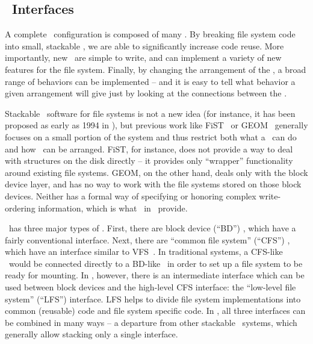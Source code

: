 \subsection {\Module\ Interfaces}
\label{sec:design:interfaces}

A complete \Kudos\ configuration is composed of many \modules. By breaking file
system code into small, stackable \modules, we are able to significantly
increase code reuse. More importantly, new \modules\ are simple to write, and
can implement a variety of new features for the file system. Finally, by
changing the arrangement of the \modules, a broad range of behaviors can be
implemented -- and it is easy to tell what behavior a given arrangement will
give just by looking at the connections between the \modules.


Stackable \module\ software for file systems is not a new idea (for instance, it
has been proposed as early as 1994 in \cite{heidemann94stackable}), but previous
work like FiST~\cite{zadok00fist} or GEOM~\cite{geom} generally focuses on a
small portion of the system and thus restrict both what a \module\ can do and
how \modules\ can be arranged. FiST, for instance, does not provide a way to
deal with structures on the disk directly -- it provides only ``wrapper''
functionality around existing file systems. GEOM, on the other hand, deals only
with the block device layer, and has no way to work with the file systems stored
on those block devices. Neither has a formal way of specifying or honoring
complex write-ordering information, which is what \chdescs\ in \Kudos\ provide.

\Kudos\ has three major types of \modules. First, there are block device
(``BD'') \modules, which have a fairly conventional interface. Next, there are
``common file system'' (``CFS'') \modules, which have an interface similar to
VFS~\cite{kleiman86vnodes}. In traditional systems, a CFS-like \module\ would be
connected directly to a BD-like \module\ in order to set up a file system to be
ready for mounting. In \Kudos, however, there is an intermediate interface which
can be used between block devices and the high-level CFS interface: the
``low-level file system'' (``LFS'') interface. LFS helps to divide file system
implementations into common (reusable) code and file system specific code. In
\Kudos, all three interfaces can be combined in many ways -- a departure from
other stackable \module\ systems, which generally allow stacking only a single
interface.

